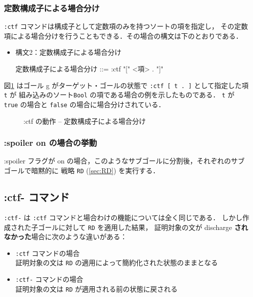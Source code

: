 \documentclass[a4paper,oneside,10pt,here]{memoir}
\newenvironment{vvtm}%
{\parskip=0pt\lineskip=0pt\begin{center}\begin{minipage}{0.8\textwidth}\begin{snugshade}}%
  {\end{snugshade}\end{minipage}\end{center}}
\begin{document}
\subsubsection{定数構成子による場合分け}
\texttt{:ctf} コマンドは構成子として定数項のみを持つソートの項を指定し，
その定数項による場合分けを行うこともできる．その場合の構文は下のとおりである．
\begin{itemize}
\item 構文2：定数構成子による場合分け
  \begin{vvtm}
    \begin{simplev}
      定数構成子による場合分け ::= :ctf "[" <項> . "]"
    \end{simplev}
  \end{vvtm}
\end{itemize}
図\ref{fig:ctf2} はゴール g がターゲット・ゴールの状態で
 \texttt{:ctf [ t . ]} として指定した項 \texttt{t} が
組み込みのソート\texttt{Bool} の項である場合の例を示したものである．
\texttt{t} が \texttt{true} の場合と \texttt{false} の場合に場合分けされている．
\begin{figure}[hbt]
  \centering
  
  \caption{:ctf の動作 -- 定数構成子による場合分け}
  \label{fig:ctf2}
\end{figure}


\subsubsection{:spoiler on の場合の挙動}
:spoiler フラグが on の場合，このようなサブゴールに分割後，それぞれのサブゴールで暗黙的に
戦略 \texttt{RD} (\ref{sec:RD}) を実行する．

\subsection{:ctf- コマンド}\label{sec:ctf-}

\texttt{:ctf-} は \texttt{:ctf} コマンドと場合わけの機能については全く同じである．
しかし作成された子ゴールに対して \texttt{RD} を適用した結果，
証明対象の文が discharge \textbf{されなかった}場合に次のような違いがある：
\begin{itemize}
\item \texttt{:ctf} コマンドの場合\\
  証明対象の文は \texttt{RD} の適用によって簡約化された状態のままとなる
\item \texttt{:ctf-} コマンドの場合\\
  証明対象の文は \texttt{RD} が適用される前の状態に戻される
\end{itemize}
\end{document}
